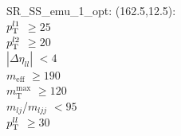 SR\_SS\_emu\_1\_opt: (162.5,12.5): \\
$p_{\text{T}}^{l1}$ $\geq 25$ \\
$p_{\text{T}}^{l2}$ $\geq 20$ \\
$|\Delta\eta_{ll}|$ $<4$ \\
$m_{\text{eff}}$ $\geq 190$ \\
$m_{\text{T}}^{\text{max}}$ $\geq 120$ \\
$m_{lj}$/$m_{ljj}$ $<95$ \\
$p_{\text{T}}^{ll}$ $\geq 30$ \\
